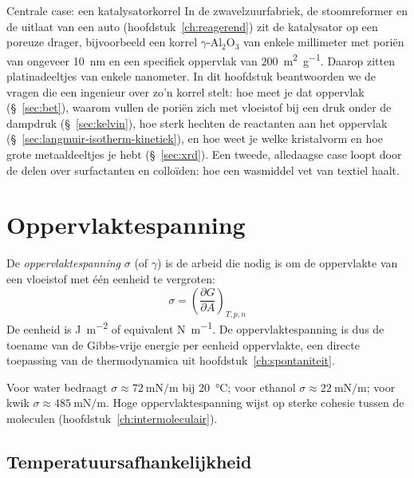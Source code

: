 \begin{toepassing}{Centrale case: een katalysatorkorrel}
In de zwavelzuurfabriek, de stoomreformer en de uitlaat van een auto (hoofdstuk~\ref{ch:reagerend}) zit de katalysator op een poreuze drager, bijvoorbeeld een korrel $\gamma$-$\mathrm{Al_2O_3}$ van enkele millimeter met poriën van ongeveer \SI{10}{\nano\metre} en een specifiek oppervlak van \SI{200}{\metre\squared\per\gram}. Daarop zitten platinadeeltjes van enkele nanometer. In dit hoofdstuk beantwoorden we de vragen die een ingenieur over zo'n korrel stelt: hoe meet je dat oppervlak (\S~\ref{sec:bet}), waarom vullen de poriën zich met vloeistof bij een druk onder de dampdruk (\S~\ref{sec:kelvin}), hoe sterk hechten de reactanten aan het oppervlak (\S~\ref{sec:langmuir-isotherm-kinetiek}), en hoe weet je welke kristalvorm en hoe grote metaaldeeltjes je hebt (\S~\ref{sec:xrd}). Een tweede, alledaagse case loopt door de delen over surfactanten en colloïden: hoe een wasmiddel vet van textiel haalt.
\end{toepassing}

\section{Oppervlaktespanning}
\label{sec:oppervlaktespanning}

De \emph{oppervlaktespanning} $\sigma$ (of $\gamma$) is de arbeid die nodig is om de oppervlakte van een vloeistof met \'e\'en eenheid te vergroten:
\begin{equation}
\boxed{\;\sigma = \left(\frac{\partial G}{\partial A}\right)_{T,p,n}\;}
\label{eq:oppervlaktespanning}
\end{equation}
De eenheid is \si{\joule\per\metre\squared} of equivalent \si{\newton\per\metre}. De oppervlaktespanning is dus de toename van de Gibbs-vrije energie per eenheid oppervlakte, een directe toepassing van de thermodynamica uit hoofdstuk~\ref{ch:spontaniteit}.

Voor water bedraagt $\sigma \approx \SI{72}{\milli\newton\per\metre}$ bij \SI{20}{\celsius}; voor ethanol $\sigma \approx \SI{22}{\milli\newton\per\metre}$; voor kwik $\sigma \approx \SI{485}{\milli\newton\per\metre}$. Hoge oppervlaktespanning wijst op sterke cohesie tussen de moleculen (hoofdstuk~\ref{ch:intermoleculair}).

\subsection{Temperatuursafhankelijkheid}

